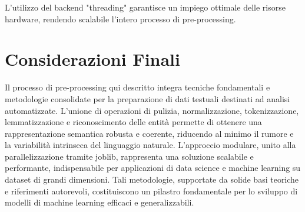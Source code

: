 L'utilizzo del backend "threading" garantisce un impiego ottimale delle risorse hardware, rendendo scalabile l'intero processo di pre-processing.

\section{Considerazioni Finali}
Il processo di pre-processing qui descritto integra tecniche fondamentali e metodologie consolidate per la preparazione di dati testuali destinati ad analisi automatizzate. L'unione di operazioni di pulizia, normalizzazione, tokenizzazione, lemmatizzazione e riconoscimento delle entità permette di ottenere una rappresentazione semantica robusta e coerente, riducendo al minimo il rumore e la variabilità intrinseca del linguaggio naturale. 
L'approccio modulare, unito alla parallelizzazione tramite joblib, rappresenta una soluzione scalabile e performante, indispensabile per applicazioni di data science e machine learning su dataset di grandi dimensioni. Tali metodologie, supportate da solide basi teoriche e riferimenti autorevoli, costituiscono un pilastro fondamentale per lo sviluppo di modelli di machine learning efficaci e generalizzabili.
